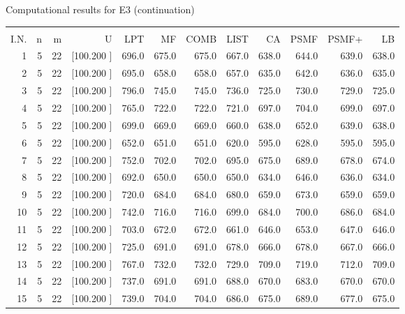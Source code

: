 \documentclass[12pt,a4paper]{article}
\begin{document}
\newpage
\begin{center}
 Computational results for E3 (continuation) {\tiny
\begin{tabular}{r r r r r r r r r r r r}\hline
    &   &   &          &        &        &        &        &        &        &        &       \\[-0.1in]
  I.N.  &  n  &  m  &  U  &  LPT  &  MF  &  COMB  &  LIST  &  CA  & PSMF &PSMF+ & LB \\[0.03in]
\hline
   1&  5& 22&[100.200   ]&   696.0&   675.0&   675.0&   667.0&   638.0&   644.0&   639.0&   638.0\\[-0.02in]
   2&  5& 22&[100.200   ]&   695.0&   658.0&   658.0&   657.0&   635.0&   642.0&   636.0&   635.0\\[-0.02in]
   3&  5& 22&[100.200   ]&   796.0&   745.0&   745.0&   736.0&   725.0&   730.0&   729.0&   725.0\\[-0.02in]
   4&  5& 22&[100.200   ]&   765.0&   722.0&   722.0&   721.0&   697.0&   704.0&   699.0&   697.0\\[-0.02in]
   5&  5& 22&[100.200   ]&   699.0&   669.0&   669.0&   660.0&   638.0&   652.0&   639.0&   638.0\\[-0.02in]
   6&  5& 22&[100.200   ]&   652.0&   651.0&   651.0&   620.0&   595.0&   628.0&   595.0&   595.0\\[-0.02in]
   7&  5& 22&[100.200   ]&   752.0&   702.0&   702.0&   695.0&   675.0&   689.0&   678.0&   674.0\\[-0.02in]
   8&  5& 22&[100.200   ]&   692.0&   650.0&   650.0&   650.0&   634.0&   646.0&   636.0&   634.0\\[-0.02in]
   9&  5& 22&[100.200   ]&   720.0&   684.0&   684.0&   680.0&   659.0&   673.0&   659.0&   659.0\\[-0.02in]
  10&  5& 22&[100.200   ]&   742.0&   716.0&   716.0&   699.0&   684.0&   700.0&   686.0&   684.0\\[-0.02in]
  11&  5& 22&[100.200   ]&   703.0&   672.0&   672.0&   661.0&   646.0&   653.0&   647.0&   646.0\\[-0.02in]
  12&  5& 22&[100.200   ]&   725.0&   691.0&   691.0&   678.0&   666.0&   678.0&   667.0&   666.0\\[-0.02in]
  13&  5& 22&[100.200   ]&   767.0&   732.0&   732.0&   729.0&   709.0&   719.0&   712.0&   709.0\\[-0.02in]
  14&  5& 22&[100.200   ]&   737.0&   691.0&   691.0&   688.0&   670.0&   683.0&   670.0&   670.0\\[-0.02in]
  15&  5& 22&[100.200   ]&   739.0&   704.0&   704.0&   686.0&   675.0&   689.0&   677.0&   675.0\\[-0.02in]

\end{tabular}}
\end{center}
\end{document}
